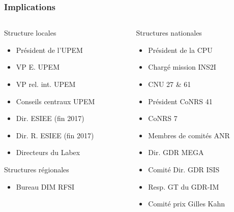 \documentclass[]{beamer}
\begin{document}
\begin{frame}
  \frametitle{Implications}

  \begin{columns}
    \begin{column}{0.5\textwidth}
      \begin{block}{Structure locales}
      	\begin{itemize}
        	\item Président de l'UPEM
        	\item VP E. UPEM
        	\item VP rel. int. UPEM
        	\item Conseils centraux UPEM
        	\item Dir. ESIEE (fin 2017)
        	\item Dir. R. ESIEE (fin 2017)
        	\item Directeurs du Labex
      	\end{itemize}
      \end{block}
      \begin{block}{Structures régionales}
        \begin{itemize}
           \item Bureau DIM RFSI
        \end{itemize}
      \end{block}
    \end{column}
    \begin{column}{0.5\textwidth}
      \begin{block}{Structures nationales}
      	\begin{itemize}
        	\item Président de la CPU
        	\item Chargé mission INS2I
        	\item CNU 27 \& 61
        	\item Président CoNRS 41
        	\item CoNRS 7
        	\item Membres de comités ANR
        	\item Dir. GDR MEGA
        	\item Comité Dir. GDR ISIS
        	\item Resp. GT du GDR-IM
        	\item Comité prix Gilles Kahn
      	\end{itemize}
      \end{block}
    \end{column}
  \end{columns}
\end{frame}
\end{document}
